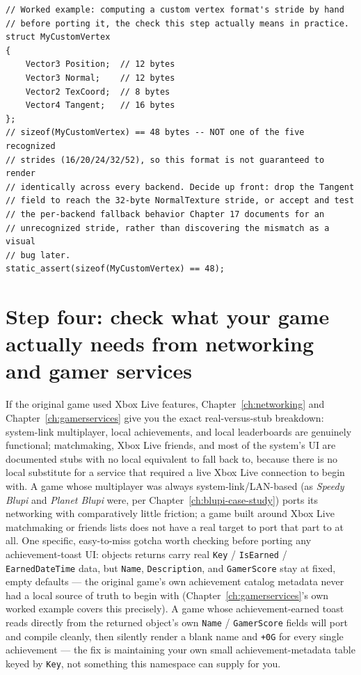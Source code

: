 \begin{lstlisting}
// Worked example: computing a custom vertex format's stride by hand
// before porting it, the check this step actually means in practice.
struct MyCustomVertex
{
    Vector3 Position;  // 12 bytes
    Vector3 Normal;    // 12 bytes
    Vector2 TexCoord;  // 8 bytes
    Vector4 Tangent;   // 16 bytes
};
// sizeof(MyCustomVertex) == 48 bytes -- NOT one of the five recognized
// strides (16/20/24/32/52), so this format is not guaranteed to render
// identically across every backend. Decide up front: drop the Tangent
// field to reach the 32-byte NormalTexture stride, or accept and test
// the per-backend fallback behavior Chapter 17 documents for an
// unrecognized stride, rather than discovering the mismatch as a visual
// bug later.
static_assert(sizeof(MyCustomVertex) == 48);
\end{lstlisting}

\section{Step four: check what your game actually needs from networking and gamer services}

If the original game used Xbox Live features, Chapter~\ref{ch:networking} and
Chapter~\ref{ch:gamerservices} give you the exact real-versus-stub breakdown: system-link
multiplayer, local achievements, and local leaderboards are genuinely functional; matchmaking,
Xbox Live friends, and most of the  system's UI are documented stubs with no
local equivalent to fall back to, because there is no local substitute for a service that
required a live Xbox Live connection to begin with. A game whose multiplayer was always
system-link/LAN-based (as \emph{Speedy Blupi} and \emph{Planet Blupi} were, per
Chapter~\ref{ch:blupi-case-study}) ports its networking with comparatively little friction;
a game built around Xbox Live matchmaking or friends lists does not have a real target to
port that part to at all. One specific, easy-to-miss gotcha worth checking before porting any
achievement-toast UI:  objects 
returns carry real \texttt{Key} / \texttt{IsEarned} / \texttt{EarnedDateTime} data, but
\texttt{Name}, \texttt{Description}, and \texttt{GamerScore} stay at fixed, empty defaults ---
the original game's own achievement catalog metadata never had a local source of truth to begin
with (Chapter~\ref{ch:gamerservices}'s own worked example covers this precisely). A game whose
achievement-earned toast reads directly from the returned  object's own
\texttt{Name} / \texttt{GamerScore} fields will port and compile cleanly, then silently render a
blank name and \texttt{+0G} for every single achievement --- the fix is maintaining your own
small achievement-metadata table keyed by \texttt{Key}, not something this namespace can supply
for you.

